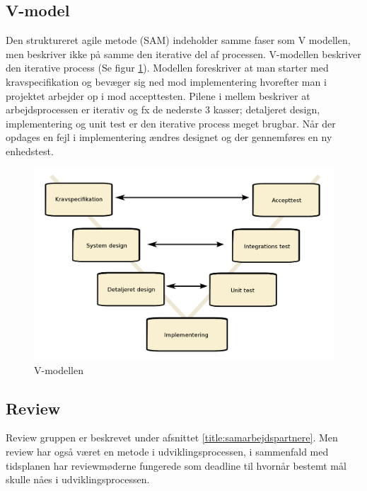\subsection{V-model}
Den struktureret agile metode (SAM) indeholder samme faser som V modellen, men beskriver ikke på samme den iterative del af processen. V-modellen beskriver den iterative process (Se figur \ref{fig:vmodel}). Modellen foreskriver at man starter med kravspecifikation og bevæger sig ned mod implementering hvorefter man i projektet arbejder op i mod accepttesten. Pilene i mellem beskriver at arbejdsprocessen er iterativ og fx de nederste 3 kasser; detaljeret design, implementering og unit test er den iterative process meget brugbar. Når der opdages en fejl i implementering ændres designet og der gennemføres en ny enhedstest.  
\begin{figure}[H]
	\includegraphics[width = \textwidth]{billeder/vmodel.png}
	\caption{V-modellen}\label{fig:vmodel}
\end{figure}

\subsection{Review}
Review gruppen er beskrevet under afsnittet \ref{title:samarbejdspartnere}. Men review har også været en metode i udviklingsprocessen, i sammenfald med tidsplanen har reviewmøderne fungerede som deadline til hvornår bestemt mål skulle nåes i udviklingsprocessen. 
